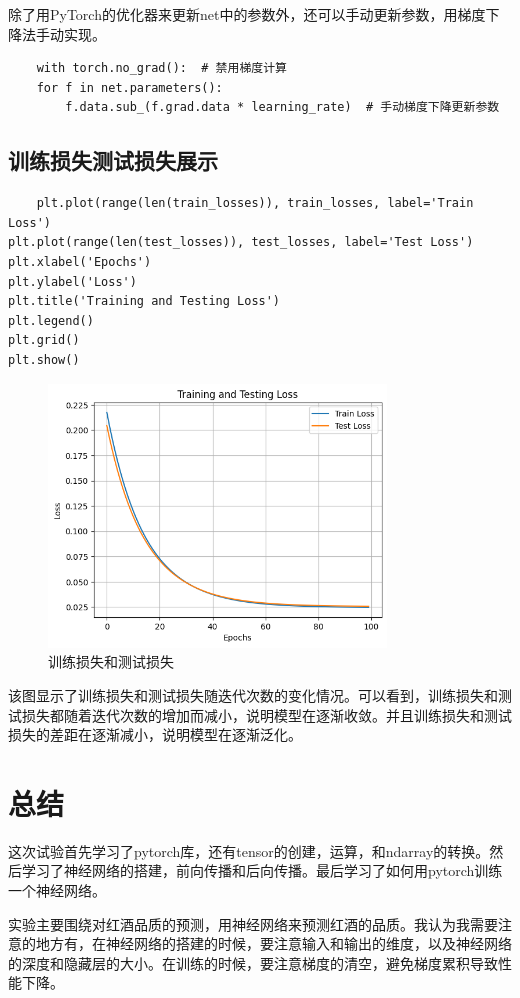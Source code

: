 \documentclass[12pt,a4paper,oneside]{article}
\begin{document}
除了用PyTorch的优化器来更新net中的参数外，还可以手动更新参数，用梯度下降法手动实现。
\begin{lstlisting}
    with torch.no_grad():  # 禁用梯度计算
    for f in net.parameters():
        f.data.sub_(f.grad.data * learning_rate)  # 手动梯度下降更新参数

\end{lstlisting}


\subsection{训练损失测试损失展示}

\begin{lstlisting}
    plt.plot(range(len(train_losses)), train_losses, label='Train Loss')
plt.plot(range(len(test_losses)), test_losses, label='Test Loss')
plt.xlabel('Epochs')
plt.ylabel('Loss')
plt.title('Training and Testing Loss')
plt.legend()
plt.grid()
plt.show()
\end{lstlisting}

\begin{figure}[H]
    \centering
    \includegraphics[width=0.8\textwidth]{image/3.png}
    \caption{训练损失和测试损失}
\end{figure}

该图显示了训练损失和测试损失随迭代次数的变化情况。可以看到，训练损失和测试损失都随着迭代次数的增加而减小，说明模型在逐渐收敛。并且训练损失和测试损失的差距在逐渐减小，说明模型在逐渐泛化。
\section{总结}
\qquad 这次试验首先学习了pytorch库，还有tensor的创建，运算，和ndarray的转换。然后学习了神经网络的搭建，前向传播和后向传播。最后学习了如何用pytorch训练一个神经网络。

实验主要围绕对红酒品质的预测，用神经网络来预测红酒的品质。我认为我需要注意的地方有，在神经网络的搭建的时候，要注意输入和输出的维度，以及神经网络的深度和隐藏层的大小。在训练的时候，要注意梯度的清空，避免梯度累积导致性能下降。
\end{document}
